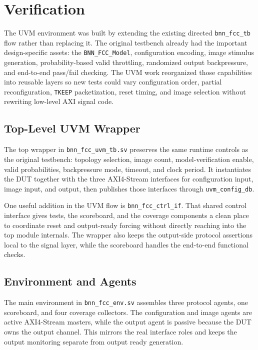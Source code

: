 \section{Verification}

The UVM environment was built by extending the existing directed
\texttt{bnn\_fcc\_tb} flow rather than replacing it. The original testbench
already had the important design-specific assets: the 
\texttt{BNN\_FCC\_Model}, configuration encoding, image stimulus generation,
probability-based valid throttling, randomized output backpressure, and
end-to-end pass/fail checking. The UVM work reorganized those capabilities into
reusable layers so new tests could vary configuration order, partial
reconfiguration, \texttt{TKEEP} packetization, reset timing, and image
selection without rewriting low-level AXI signal code.

\subsection{Top-Level UVM Wrapper}

The top wrapper in \texttt{bnn\_fcc\_uvm\_tb.sv}
preserves the same runtime controls as the original testbench: topology
selection, image count, model-verification enable, valid probabilities,
backpressure mode, timeout, and clock period. It instantiates the DUT together
with the three AXI4-Stream interfaces for configuration input, image input, and
output, then publishes those interfaces through \texttt{uvm\_config\_db}.

One useful addition in the UVM flow is \texttt{bnn\_fcc\_ctrl\_if}. That shared
control interface gives tests, the scoreboard, and the coverage components a
clean place to coordinate reset and output-ready forcing without directly
reaching into the top module internals. The wrapper also keeps the output-side
protocol assertions local to the signal layer, while the scoreboard handles the
end-to-end functional checks.

\subsection{Environment and Agents}

The main environment in \texttt{bnn\_fcc\_env.sv}
assembles three protocol agents, one scoreboard, and four coverage collectors.
The configuration and image agents are active AXI4-Stream masters, while the
output agent is passive because the DUT owns the output channel. This mirrors
the real interface roles and keeps the output monitoring separate from output
ready generation.


